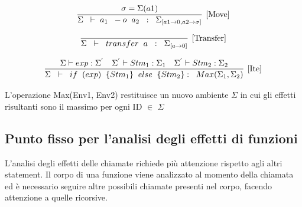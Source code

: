 \documentclass[12pt,twoside,openright,a4paper]{report}
\begin{document}
    \begin{align*}
    \infer[\mathrm{[Move]}]
    {\Sigma \hspace{0.2cm} \vdash  \hspace{0.1cm}a_{1}\hspace{0.2cm} -o\hspace{0.2cm} a_{2} \hspace{0.2cm}: \hspace{0.2cm}\Sigma_{[a1 \to 0, a2 \to \sigma]} } 
    {\sigma = \Sigma(a1)}
    {}
    \end{align*}
    
    \begin{align*}
    \infer[\mathrm{[Transfer]}]
    {\Sigma \hspace{0.2cm} \vdash  \hspace{0.2cm}transfer\hspace{0.1cm} \hspace{0.1cm} a \hspace{0.2cm}: \hspace{0.2cm}\Sigma_{[a \to 0]} } 
    {}
    \end{align*}
    
    \begin{align*}
    \infer[\mathrm{[Ite]}]
    {\Sigma \hspace{0.2cm} \vdash  \hspace{0.2cm}if\hspace{0.2cm} (exp)\hspace{0.2cm} \{Stm_{1}\}\hspace{0.2cm} else \hspace{0.2cm}\{Stm_{2}\} : \hspace{0.2cm}Max(\Sigma_{1},\Sigma_{2}) } 
    {  \Sigma \vdash exp : \Sigma^{'} &  \Sigma^{'} \vdash Stm_{1} :  \Sigma_{1} & \Sigma^{'} \vdash Stm_{2} : \Sigma_{2} }
    \end{align*}
    
    L'operazione Max(Env1, Env2) restituisce un nuovo ambiente $\Sigma$ in cui gli effetti risultanti sono il massimo per ogni ID $\in$ $\Sigma$ 
    
    
\subsection{Punto fisso per l'analisi degli effetti di funzioni}
L'analisi degli effetti delle chiamate richiede più attenzione rispetto agli altri statement. Il corpo di una funzione viene analizzato al momento della chiamata ed è necessario seguire altre possibili chiamate presenti nel corpo, facendo attenzione a quelle ricorsive.
\end{document}
